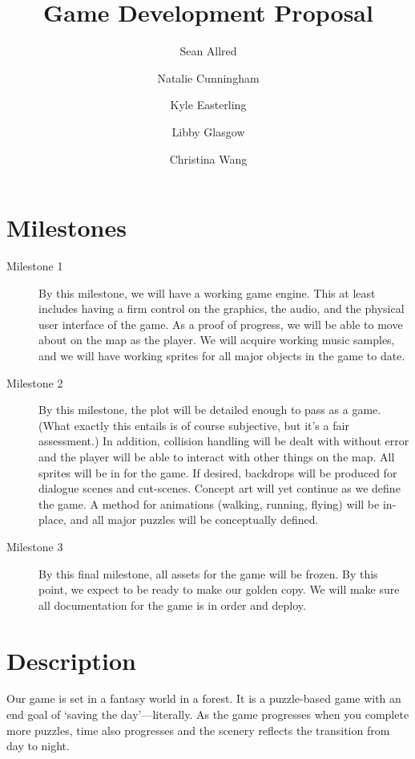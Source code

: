 \documentclass[letterpaper]{article}
\title{Game Development Proposal}
\author{%
  Sean Allred \and
  Natalie Cunningham \and
  Kyle Easterling \and
  Libby Glasgow \and
  Christina Wang}
\begin{document}
\maketitle

\section{Milestones}
\label{sec:milestones}

\begin{description}
\item[Milestone 1]
  By this milestone, we will have a working game engine.
  This at least includes having a firm control on
    the graphics,
    the audio,
    and the physical user interface
    of the game.
  As a proof of progress, we will be able to
    move about on the map as the player.
  We will acquire working music samples,
    and we will have working sprites for all major objects in the game to date.
\item[Milestone 2]
  By this milestone, the plot will be detailed enough to pass as a game.
  (What exactly this entails is of course subjective, but it's a fair assessment.)
  In addition, collision handling will be dealt with without error
    and the player will be able to interact with other things on the map.
  All sprites will be in for the game.
  If desired, backdrops will be produced for dialogue scenes and cut-scenes.
  Concept art will yet continue as we define the game.
  A method for animations (walking, running, flying) will be in-place, and
    all major puzzles will be conceptually defined.
\item[Milestone 3]
  By this final milestone, all assets for the game will be frozen.
  By this point, we expect to be ready to make our golden copy.
  We will make sure all documentation for the game is in order and deploy.
\end{description}

\section{Description}
\label{sec:description}

\def\GameTitle{\textit}

Our game is set in a fantasy world in a forest.
It is a puzzle-based game with an end goal of \enquote*{saving the day}---literally.
As the game progresses when you complete more puzzles,
  time also progresses and the scenery reflects the transition from day to night.
\end{document}

